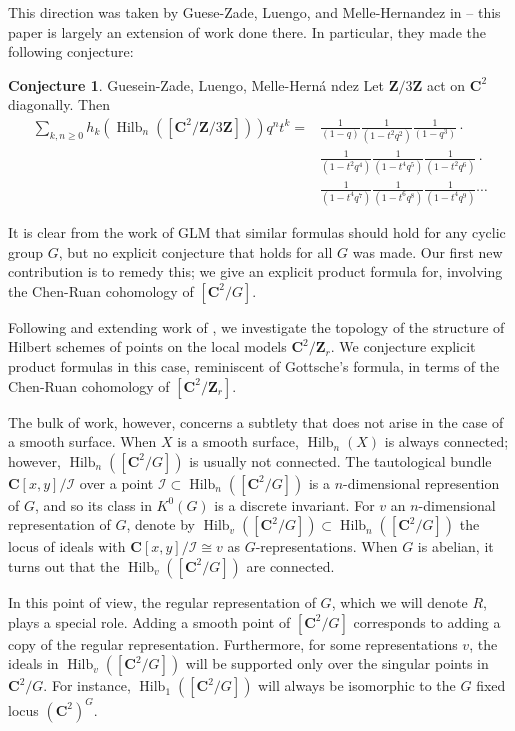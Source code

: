 \documentclass{amsart}[12pt]
\theoremstyle{definition}
\newtheorem{conjecture}[dummy]{Conjecture}
\newcommand{\Z}{\mathbf{Z}}
\newcommand{\C}{\mathbf{C}}
\DeclareMathOperator{\Hilb}{Hilb}
\begin{document}
This direction was taken by Guese-Zade, Luengo, and Melle-Hernandez in \cite{GLM} -- this paper is largely an extension of work done there.  In particular, they made the following conjecture:

\begin{conjecture}{Guesein-Zade, Luengo, Melle-Hern\'a ndez}
Let $\Z/3\Z$ act on $\C^2$ diagonally.  Then
\begin{equation*}
\begin{split}
\sum_{k, n\geq 0} h_k(\Hilb_n([\C^2/\Z/3\Z]))q^nt^k =&\frac{1}{(1-q)}
\frac{1}{(1-t^2q^2)}\frac{1}{(1-q^3)} \cdot \\
&\frac{1}{(1-t^2q^4)}\frac{1}{(1-t^4q^5)}\frac{1}{(1-t^2q^6)}\cdot \\
&\frac{1}{(1-t^4q^7)}\frac{1}{(1-t^6q^8)}\frac{1}{(1-t^4q^9)}\cdots
\end{split}
\end{equation*}
\end{conjecture}

It is clear from the work of GLM that similar formulas should hold for any cyclic group $G$, but no explicit conjecture that holds for all $G$ was made.  Our first new contribution is to remedy this; we give an explicit product formula for, involving the Chen-Ruan cohomology of $[\C^2/G]$.


Following and extending work of , we investigate the topology of the structure of Hilbert schemes of points on the local models $\C^2/\Z_r$.  We conjecture explicit product formulas in this case, reminiscent of Gottsche's formula, in terms of the Chen-Ruan cohomology of $[\C^2/\Z_r]$.  

The bulk of work, however, concerns a subtlety that does not arise in the case of a smooth surface.  When $X$ is a smooth surface, $\Hilb_n(X)$ is always connected; however, $\Hilb_n([\C^2/G])$ is usually not connected.  The tautological bundle $\C[x,y]/\mathcal{I}$ over a point $\mathcal{I}\subset\Hilb_n([\C^2/G])$ is a $n$-dimensional represention of $G$, and so its class in $K^0(G)$ is a discrete invariant.  For $v$ an $n$-dimensional representation of $G$, denote by $\Hilb_v([\C^2/G])\subset \Hilb_n([\C^2/G])$ the locus of ideals with $\C[x,y]/\mathcal{I}\cong v$ as $G$-representations.  When $G$ is abelian, it turns out that the $\Hilb_v([\C^2/G])$ are connected.  

In this point of view, the regular representation of $G$, which we will denote $R$, plays a special role.  Adding a smooth point of $[\C^2/G]$ corresponds to adding a copy of the regular representation.  Furthermore, for some representations $v$, the ideals in $\Hilb_v([\C^2/G])$ will be supported only over the singular points in $\C^2/G$.  For instance, $\Hilb_1([\C^2/G])$ will always be isomorphic to the $G$ fixed locus $(\C^2)^G$.
\end{document}
